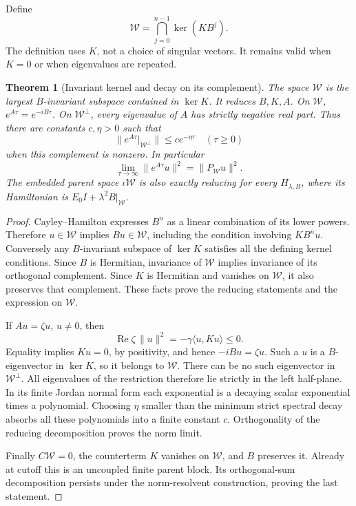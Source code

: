 \documentclass[11pt]{article}
\newtheorem{theorem}{Theorem}[section]
\theoremstyle{remark}
\begin{document}
Define
\[
 \mathcal W=\bigcap_{j=0}^{n-1}\ker(KB^j).
\]
The definition uses \(K\), not a choice of singular vectors.
It remains valid when \(K=0\) or when eigenvalues are repeated.

\begin{theorem}[Invariant kernel and decay on its complement]
\label{thm:v20v53-dark}
The space \(\mathcal W\) is the largest \(B\)-invariant subspace
contained in \(\ker K\).  It reduces \(B,K,A\).
On \(\mathcal W\), \(e^{A\tau}=e^{-iB\tau}\).
On \(\mathcal W^\perp\), every eigenvalue of \(A\) has strictly
negative real part.  Thus there are constants \(c,\eta>0\)
such that
\[
 \|e^{A\tau}|_{\mathcal W^\perp}\|\leq c e^{-\eta\tau}
 \quad(\tau\geq0)
\]
when this complement is nonzero.  In particular
\[
 \lim_{\tau\to\infty}\|e^{A\tau}u\|^2
                      =\|P_{\mathcal W}u\|^2.
\]
The embedded parent space \(\iota\mathcal W\) is also exactly
reducing for every \(H_{\lambda,B}\), where its Hamiltonian is
\(E_0I+\lambda^2 B|_{\mathcal W}\).
\end{theorem}
\begin{proof}
Cayley--Hamilton expresses \(B^n\) as a linear combination
of its lower powers.  Therefore \(u\in\mathcal W\) implies
\(Bu\in\mathcal W\), including the condition involving
\(KB^n u\).  Conversely any \(B\)-invariant subspace of
\(\ker K\) satisfies all the defining kernel conditions.
Since \(B\) is Hermitian, invariance of \(\mathcal W\)
implies invariance of its orthogonal complement.
Since \(K\) is Hermitian and vanishes on \(\mathcal W\),
it also preserves that complement.  These facts prove the
reducing statements and the expression on \(\mathcal W\).

If \(Au=\zeta u\), \(u\ne0\), then
\[
 \operatorname{Re}\zeta\,\|u\|^2
           =-\gamma\langle u,Ku\rangle\leq0 .
\]
Equality implies \(Ku=0\), by positivity, and hence
\(-iBu=\zeta u\).  Such a \(u\) is a \(B\)-eigenvector
in \(\ker K\), so it belongs to \(\mathcal W\).
There can be no such eigenvector in \(\mathcal W^\perp\).
All eigenvalues of the restriction therefore lie strictly
in the left half-plane.  In its finite Jordan normal form
each exponential is a decaying scalar exponential times a
polynomial.  Choosing \(\eta\) smaller than the minimum
strict spectral decay absorbs all these polynomials into
a finite constant \(c\).  Orthogonality of the reducing
decomposition proves the norm limit.

Finally \(C\mathcal W=0\), the counterterm \(K\) vanishes
on \(\mathcal W\), and \(B\) preserves it.  Already at
cutoff this is an uncoupled finite parent block.
Its orthogonal-sum decomposition persists under the
norm-resolvent construction, proving the last statement.
\end{proof}
\end{document}
